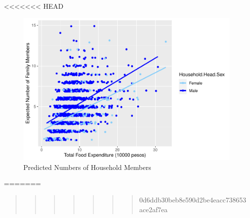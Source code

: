 \documentclass[
]{article}
\begin{document}
\textless\textless\textless\textless\textless\textless\textless{} HEAD

\begin{figure}[H]

{\centering \includegraphics[width=0.8\linewidth]{Group_01_Project2_demo_files/figure-latex/pred plot-1} 

}

\caption{Predicted Numbers of Household Members}\label{fig:pred plot}
\end{figure}

=======

\begin{quote}
\begin{quote}
\begin{quote}
\begin{quote}
\begin{quote}
\begin{quote}
\begin{quote}
0d6ddb30beb8e590d2be4eacc738653ace2af7ea
\end{quote}
\end{quote}
\end{quote}
\end{quote}
\end{quote}
\end{quote}
\end{quote}
\end{document}
